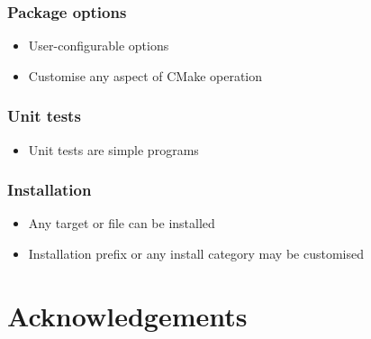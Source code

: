 \documentclass{beamer}
\begin{document}
\begin{frame}
  \frametitle{Package options}

  

  \begin{itemize}
  \item User-configurable options
  \item Customise any aspect of CMake operation
  \end{itemize}
\end{frame}

\begin{frame}
  \frametitle{Unit tests}

  

  \begin{itemize}
  \item Unit tests are simple programs
  \end{itemize}
\end{frame}

\begin{frame}
  \frametitle{Installation}

  

  \begin{itemize}
  \item Any target or file can be installed
  \item Installation prefix or any install category may be customised
  \end{itemize}
\end{frame}


\appendix

\section[]{Acknowledgements}
\end{document}
